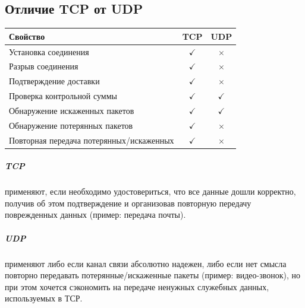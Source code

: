 \subsection{Отличие TCP от UDP}\label{subsec:tcp-vs-udp}
\begin{table}[H]
    \centering
    \begin{tabular}{|l|c|c|}
    \hline
    Свойство & TCP & UDP \\ \hline
    Установка соединения & $\checkmark$ & $\times$ \\
    Разрыв соединения &  $\checkmark$ & $\times$ \\
    Подтверждение доставки &  $\checkmark$ & $\times$ \\
    Проверка контрольной суммы  & $\checkmark$ & $\checkmark$ \\
    Обнаружение искаженных пакетов & $\checkmark$ & $\checkmark$ \\
    Обнаружение потерянных пакетов & $\checkmark$ & $\times$ \\
    Повторная передача потерянных/искаженных & $\checkmark$ & $\times$ \\
    \hline
    \end{tabular}
\end{table}

\subparagraph{TCP} применяют, если необходимо удостовериться, что все данные дошли корректно, получив об этом подтверждение и организовав повторную передачу поврежденных данных (пример: передача почты).

\subparagraph{UDP} применяют либо если канал связи абсолютно надежен, либо если нет смысла повторно передавать потерянные/искаженные пакеты (пример: видео-звонок), но при этом хочется сэкономить на передаче ненужных служебных данных, используемых в ТСР.
